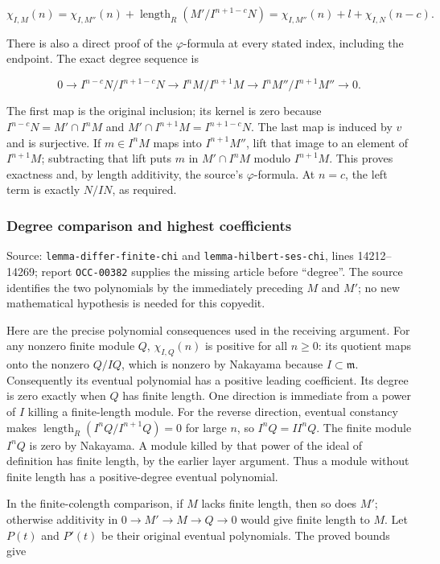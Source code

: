 \[
\chi_{I,M}(n)=\chi_{I,M''}(n)
 +\operatorname{length}_R(M'/I^{n+1-c}N)
=\chi_{I,M''}(n)+l+\chi_{I,N}(n-c).
\]

There is also a direct proof of the \(\varphi\)-formula at every stated index, including the endpoint. The exact degree sequence is

\[
0\longrightarrow I^{n-c}N/I^{n+1-c}N
\longrightarrow I^nM/I^{n+1}M
\longrightarrow I^nM''/I^{n+1}M''\longrightarrow0.
\]

The first map is the original inclusion; its kernel is zero because \(I^{n-c}N=M'\cap I^nM\) and \(M'\cap I^{n+1}M=I^{n+1-c}N\). The last map is induced by \(v\) and is surjective. If \(m\in I^nM\) maps into \(I^{n+1}M''\), lift that image to an element of \(I^{n+1}M\); subtracting that lift puts \(m\) in \(M'\cap I^nM\) modulo \(I^{n+1}M\). This proves exactness and, by length additivity, the source's \(\varphi\)-formula. At \(n=c\), the left term is exactly \(N/IN\), as required.

\subsubsection{Degree comparison and highest coefficients}\label{degree-comparison-and-highest-coefficients}

Source: \texttt{lemma-differ-finite-chi} and \texttt{lemma-hilbert-ses-chi}, lines 14212--14269; report \texttt{OCC-00382} supplies the missing article before ``degree''. The source identifies the two polynomials by the immediately preceding \(M\) and \(M'\); no new mathematical hypothesis is needed for this copyedit.

Here are the precise polynomial consequences used in the receiving argument. For any nonzero finite module \(Q\), \(\chi_{I,Q}(n)\) is positive for all \(n\geq0\): its quotient maps onto the nonzero \(Q/IQ\), which is nonzero by Nakayama because \(I\subset\mathfrak m\). Consequently its eventual polynomial has a positive leading coefficient. Its degree is zero exactly when \(Q\) has finite length. One direction is immediate from a power of \(I\) killing a finite-length module. For the reverse direction, eventual constancy makes \(\operatorname{length}_R(I^nQ/I^{n+1}Q)=0\) for large \(n\), so \(I^nQ=I I^nQ\). The finite module \(I^nQ\) is zero by Nakayama. A module killed by that power of the ideal of definition has finite length, by the earlier layer argument. Thus a module without finite length has a positive-degree eventual polynomial.

In the finite-colength comparison, if \(M\) lacks finite length, then so does \(M'\); otherwise additivity in \(0\to M'\to M\to Q\to0\) would give finite length to \(M\). Let \(P(t)\) and \(P'(t)\) be their original eventual polynomials. The proved bounds give

